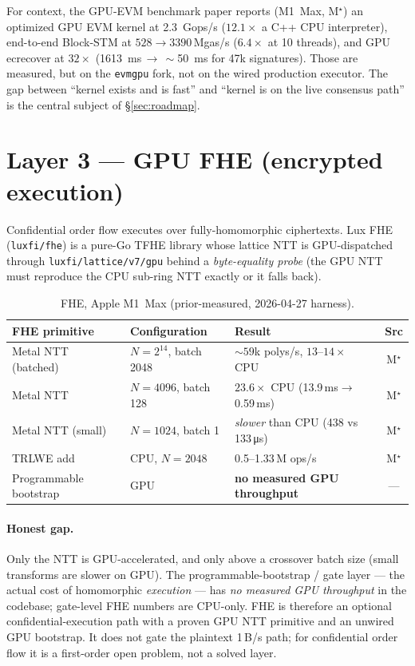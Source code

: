 \documentclass[11pt,a4paper]{article}
\newcommand{\Mprior}{M$^\star$}                          %
\begin{document}
For context, the GPU-EVM benchmark paper \cite{evmgpubench} reports
(M1~Max, \Mprior) an optimized GPU EVM kernel at \SI{2.3}{Gops/s}
($12.1\times$ a C++ CPU interpreter), end-to-end Block-STM at
$528\!\to\!3390$\,Mgas/s ($6.4\times$ at 10 threads), and GPU ecrecover
at $32\times$ (\SI{1613}{ms}\,$\to\,{\sim}$\SI{50}{ms} for 47k
signatures). Those are measured, but on the \texttt{evmgpu} fork, not on
the wired production executor. The gap between ``kernel exists and is
fast'' and ``kernel is on the live consensus path'' is the central
subject of \S\ref{sec:roadmap}.

\section{Layer 3 --- GPU FHE (encrypted execution)}\label{sec:l3}

Confidential order flow executes over fully-homomorphic ciphertexts. Lux
FHE (\texttt{luxfi/fhe}) is a pure-Go TFHE library whose lattice NTT is
GPU-dispatched through \texttt{luxfi/lattice/v7/gpu} behind a
\emph{byte-equality probe} (the GPU NTT must reproduce the CPU sub-ring
NTT exactly or it falls back).

\begin{table}[h]\centering\small
\begin{tabular}{@{}lll c@{}}
\toprule
FHE primitive & Configuration & Result & Src \\
\midrule
Metal NTT (batched)   & $N{=}2^{14}$, batch 2048 & ${\sim}59$k polys/s, $13$--$14\times$ CPU & \Mprior \\
Metal NTT             & $N{=}4096$, batch 128    & $23.6\times$ CPU (13.9\,ms$\to$0.59\,ms) & \Mprior \\
Metal NTT (small)     & $N{=}1024$, batch 1      & \emph{slower} than CPU (438 vs 133\,\si{\micro s}) & \Mprior \\
TRLWE add             & CPU, $N{=}2048$          & 0.5--1.33\,M ops/s & \Mprior \\
Programmable bootstrap & GPU                     & \textbf{no measured GPU throughput} & --- \\
\bottomrule
\end{tabular}
\caption{FHE, Apple M1~Max (prior-measured, 2026-04-27 harness).}
\label{tab:l3}
\end{table}

\paragraph{Honest gap.} Only the NTT is GPU-accelerated, and only above
a crossover batch size (small transforms are slower on GPU). The
programmable-bootstrap / gate layer --- the actual cost of homomorphic
\emph{execution} --- has \emph{no measured GPU throughput} in the
codebase; gate-level FHE numbers are CPU-only. FHE is therefore an
optional confidential-execution path with a proven GPU NTT primitive and
an unwired GPU bootstrap. It does not gate the plaintext 1\,B/s path; for
confidential order flow it is a first-order open problem, not a solved
layer.
\end{document}
